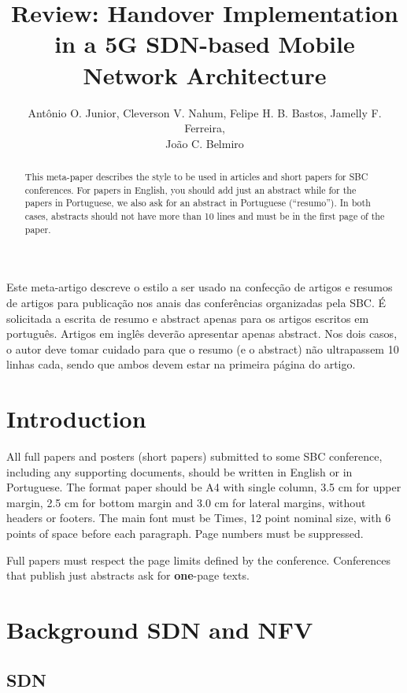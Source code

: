 \documentclass[12pt]{article}
\title{Review: Handover Implementation in a 5G SDN-based Mobile Network Architecture}
\author{Antônio O. Junior\inst{1}, Cleverson V. Nahum\inst{1}, Felipe H. B. Bastos\inst{1}, Jamelly F. Ferreira\inst{1}, \\João C. Belmiro\inst{1} }
\begin{document}
 

\maketitle

\begin{abstract}
  This meta-paper describes the style to be used in articles and short papers
  for SBC conferences. For papers in English, you should add just an abstract
  while for the papers in Portuguese, we also ask for an abstract in
  Portuguese (``resumo''). In both cases, abstracts should not have more than
  10 lines and must be in the first page of the paper.
\end{abstract}
     
\begin{resumo} 
  Este meta-artigo descreve o estilo a ser usado na confecção de artigos e
  resumos de artigos para publicação nos anais das conferências organizadas
  pela SBC. É solicitada a escrita de resumo e abstract apenas para os artigos
  escritos em português. Artigos em inglês deverão apresentar apenas abstract.
  Nos dois casos, o autor deve tomar cuidado para que o resumo (e o abstract)
  não ultrapassem 10 linhas cada, sendo que ambos devem estar na primeira
  página do artigo.
\end{resumo}


\section{Introduction}

All full papers and posters (short papers) submitted to some SBC conference,
including any supporting documents, should be written in English or in
Portuguese. The format paper should be A4 with single column, 3.5 cm for upper
margin, 2.5 cm for bottom margin and 3.0 cm for lateral margins, without
headers or footers. The main font must be Times, 12 point nominal size, with 6
points of space before each paragraph. Page numbers must be suppressed.

Full papers must respect the page limits defined by the conference.
Conferences that publish just abstracts ask for \textbf{one}-page texts.

\section{Background SDN and NFV} \label{sec:sdn}
\subsection{SDN}
\end{document}
